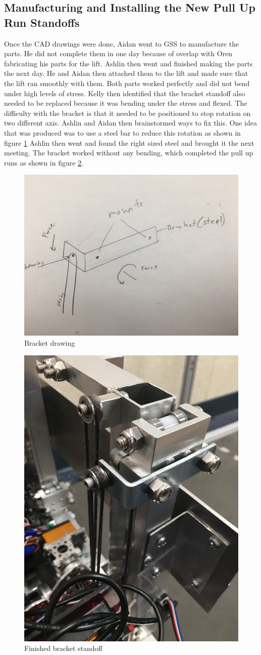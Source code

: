\documentclass{article}
\begin{document}
\subsection{Manufacturing and Installing the New Pull Up Run Standoffs}
Once the CAD drawings were done, Aidan went to GSS to manufacture the parts. He did not complete them in one day because of overlap with Oren fabricating his parts for the lift. Ashlin then went and finished making the parts the next day. He and Aidan then attached them to the lift and made sure that the lift ran smoothly with them. Both parts worked perfectly and did not bend under high levels of stress. Kelly then identified that the bracket standoff also needed to be replaced because it was bending under the stress and flexed. The difficulty with the bracket is that it needed to be positioned to stop rotation on two different axis. Ashlin and Aidan then brainstormed ways to fix this. One idea that was produced was to use a steel bar to reduce this rotation as shown in figure \ref{fig: bracket} Ashlin then went and found the right sized steel and brought it the next meeting. The bracket worked without any bending, which completed the pull up runs as shown in figure \ref{fig: bracket2}.
\begin{figure}
    \centering
    \includegraphics[width= 0.4 \textwidth]{26_02-25/images/Bracket.jpg}
    \caption{Bracket drawing}
    \label{fig: bracket}
\end{figure}
\begin{figure}
    \centering
    \includegraphics[width= 0.3 \textwidth]{26_02-25/images/Bracket2.jpg}
    \caption{Finished bracket standoff}
    \label{fig: bracket2}
\end{figure}
\end{document}

